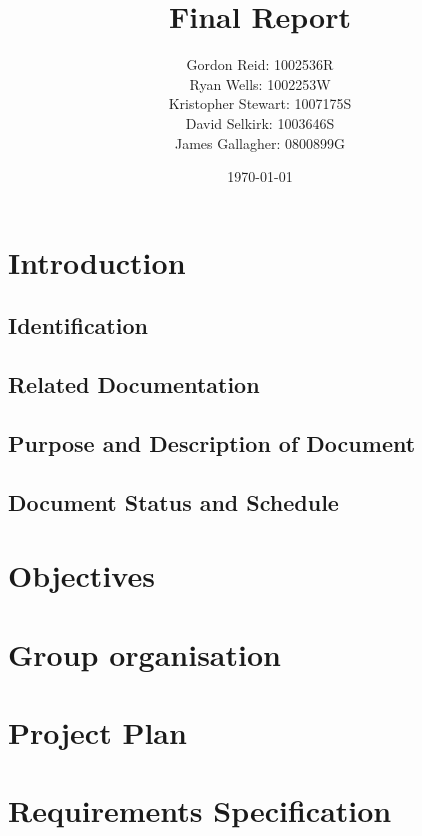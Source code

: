 \documentclass{l3deliverable}
\title{Final Report}
\author{
    Gordon Reid: 1002536R\\
    Ryan Wells: 1002253W\\
    Kristopher Stewart: 1007175S\\
    David Selkirk: 1003646S\\
    James Gallagher: 0800899G\\
}
\date{\today}
\begin{document}
\maketitle

\tableofcontents

\newpage

\section{Introduction}


\subsection{Identification}


\subsection{Related Documentation}


\subsection{Purpose and Description of Document}


\subsection{Document Status and Schedule}


\section{Objectives}


\section{Group organisation}


\section{Project Plan}


\section{Requirements Specification}

\end{document}
